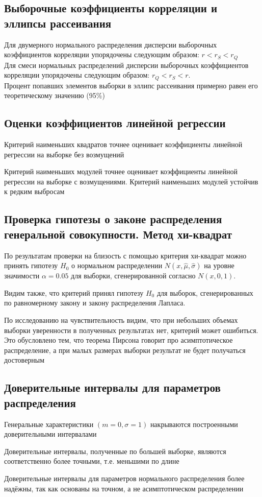 \subsection{Выборочные коэффициенты корреляции и эллипсы рассеивания}
	Для двумерного нормального распределения дисперсии выборочных коэффициентов корреляции упорядочены следующим образом:  $r < r_S < r_Q$\\
	
	Для смеси нормальных распределений дисперсии выборочных коэффициентов корреляции упорядочены следующим образом: $r_Q < r_S < r$.\\

	Процент попавших элементов выборки в эллипс рассеивания примерно равен его теоретическому значению (95\%)

\subsection{Оценки коэффициентов линейной регрессии}
	Критерий наименьших квадратов точнее оценивает коэффициенты линейной регрессии на выборке без возмущений
	
	Критерий наименьших модулей точнее оценивает коэффициенты линейной регрессии на выборке с возмущениями. Критерий наименьших модулей устойчив к редким выбросам

\subsection{Проверка гипотезы о законе распределения генеральной совокупности. Метод хи-квадрат}
	По результатам проверки на близость с помощью критерия хи-квадрат можно принять гипотезу $H_0$ о нормальном распределении $N(x, \hat\mu, \hat\sigma)$ на уровне значимости $\alpha = 0.05$ для выборки, сгенерированной согласно $N(x, 0, 1)$.

	Видим также, что критерий принял гипотезу $H_0$ для выборок, сгенерированных по равномерному закону и закону распределения Лапласа.

	По исследованию на чувствительность видим, что при небольших объемах выборки уверенности в полученных результатах нет, критерий может ошибиться. Это обусловлено тем, что теорема Пирсона говорит про асимптотическое распределение, а при малых размерах выборки результат не будет получаться достоверным

\subsection{Доверительные интервалы для параметров распределения}
	Генеральные характеристики $(m = 0, \sigma = 1)$ накрываются построенными доверительными интервалами

	Доверительные интервалы, полученные по большей выборке, являются соответственно более точными, т.е. меньшими по длине

	Доверительные интервалы для параметров нормального распределения более надёжны, так как основаны на точном, а не асимптотическом распределении
